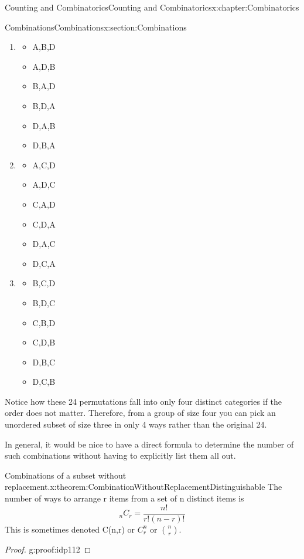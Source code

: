 \documentclass[oneside,10pt,]{book}
\numberwithin{equation}{section}
\begin{document}
\begin{chapterptx}{Counting and Combinatorics}{}{Counting and Combinatorics}{}{}{x:chapter:Combinatorics}
\begin{sectionptx}{Combinations}{}{Combinations}{}{}{x:section:Combinations}
\begin{enumerate}
\begin{itemize}[label=\textbullet]
\end{itemize}
%
\item{}%
\begin{itemize}[label=\textbullet]
\item{}A,B,D%
\item{}A,D,B%
\item{}B,A,D%
\item{}B,D,A%
\item{}D,A,B%
\item{}D,B,A%
\end{itemize}
%
\item{}%
\begin{itemize}[label=\textbullet]
\item{}A,C,D%
\item{}A,D,C%
\item{}C,A,D%
\item{}C,D,A%
\item{}D,A,C%
\item{}D,C,A%
\end{itemize}
%
\item{}%
\begin{itemize}[label=\textbullet]
\item{}B,C,D%
\item{}B,D,C%
\item{}C,B,D%
\item{}C,D,B%
\item{}D,B,C%
\item{}D,C,B%
\end{itemize}
%
\end{enumerate}
Notice how these 24 permutations fall into only four distinct categories if the order does not matter. Therefore, from a group of size four you can pick an unordered subset of size three in only 4 ways rather than the original 24.%
\par
In general, it would be nice to have a direct formula to determine the number of such combinations without having to explicitly list them all out.%
\begin{theorem}{Combinations of a subset without replacement.}{}{x:theorem:CombinationWithoutReplacementDistinguishable}%
The number of ways to arrange r items from a set of n distinct items is%
\begin{equation*}
_nC_r = \frac{n!}{r!(n-r)!} 
\end{equation*}
This is sometimes denoted C(n,r) or \(C_r^n\) or \({n \choose r}\).%
\end{theorem}
\begin{proof}{}{g:proof:idp112}

\end{proof}
\end{sectionptx}
\end{chapterptx}
\end{document}
